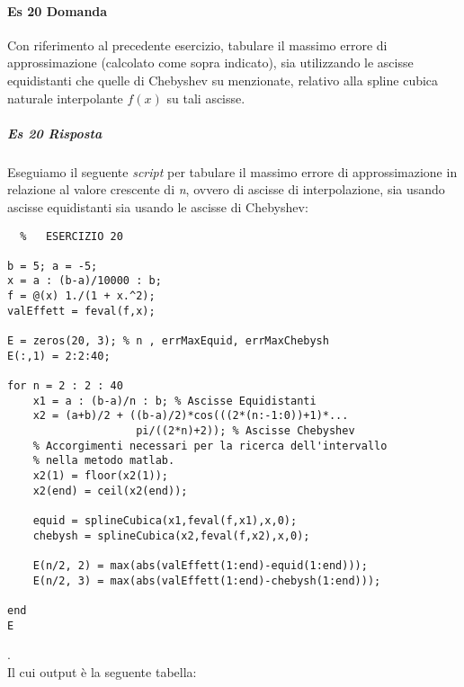 \documentclass[a4paper]{report}
\begin{document}
\paragraph{Es 20 Domanda}
Con riferimento al precedente esercizio, tabulare il massimo errore di approssimazione (calcolato come sopra indicato), sia utilizzando le ascisse equidistanti che quelle di Chebyshev su menzionate, relativo alla spline cubica naturale interpolante $f(x)$ su tali ascisse.
\subparagraph{Es 20 Risposta}
Eseguiamo il seguente \emph{script} per tabulare il massimo errore di approssimazione in relazione al valore crescente di \emph{n}, ovvero di ascisse di interpolazione, sia usando ascisse equidistanti sia usando le ascisse di Chebyshev:\\
\begin{lstlisting}	%	ESERCIZIO 20

b = 5; a = -5;
x = a : (b-a)/10000 : b;
f = @(x) 1./(1 + x.^2);
valEffett = feval(f,x);

E = zeros(20, 3); % n , errMaxEquid, errMaxChebysh
E(:,1) = 2:2:40; 

for n = 2 : 2 : 40
	x1 = a : (b-a)/n : b; % Ascisse Equidistanti
	x2 = (a+b)/2 + ((b-a)/2)*cos(((2*(n:-1:0))+1)*...
					pi/((2*n)+2)); % Ascisse Chebyshev	
	% Accorgimenti necessari per la ricerca dell'intervallo
	% nella metodo matlab.
	x2(1) = floor(x2(1));
	x2(end) = ceil(x2(end));

	equid = splineCubica(x1,feval(f,x1),x,0);
	chebysh = splineCubica(x2,feval(f,x2),x,0);

	E(n/2, 2) = max(abs(valEffett(1:end)-equid(1:end)));
	E(n/2, 3) = max(abs(valEffett(1:end)-chebysh(1:end)));

end
E
\end{lstlisting}
.\\ Il cui output è la seguente tabella:\\ \\
\end{document}
